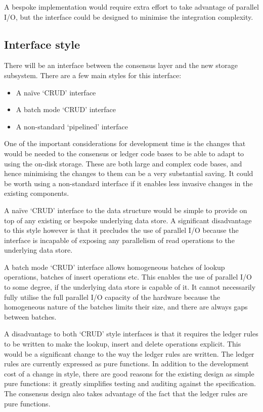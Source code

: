 \documentclass[11pt,a4paper]{article}
\begin{document}
A bespoke implementation would require extra effort to take advantage of
parallel I/O, but the interface could be designed to minimise the integration
complexity.

\subsection{Interface style}
\label{interface-style}

There will be an interface between the consensus layer and the new storage
subsystem. There are a few main styles for this interface:
\begin{itemize}
\setlength{\itemsep}{0pt}%
\setlength{\parskip}{1pt}%
\item A na\"ive `CRUD' interface
\item A batch mode `CRUD' interface
\item A non-standard `pipelined' interface
\end{itemize}

One of the important considerations for development time is the changes that
would be needed to the consensus or ledger code bases to be able to adapt to
using the on-disk storage. These are both large and complex code bases, and
hence minimising the changes to them can be a very substantial saving. It could
be worth using a non-standard interface if it enables less invasive changes in
the existing components.

A na\"ive `CRUD' interface to the data structure would be simple to provide on
top of any existing or bespoke underlying data store. A significant
disadvantage to this style however is that it precludes the use of parallel I/O
because the interface is incapable of exposing any parallelism of read
operations to the underlying data store.

A batch mode `CRUD' interface allows homogeneous batches of {\sc lookup}
operations, batches of {\sc insert} operations etc. This enables the use of
parallel I/O to some degree, if the underlying data store is capable of it. It
cannot necessarily fully utilise the full parallel I/O capacity of the hardware
because the homogeneous nature of the batches limits their size, and there are
always gaps between batches.

A disadvantage to both `CRUD' style interfaces is that it requires the ledger
rules to be written to make the {\sc lookup}, {\sc insert} and {\sc delete}
operations explicit. This would be a significant change to the way the ledger
rules are written. The ledger rules are currently expressed as pure functions.
In addition to the development cost of a change in style, there are good reasons
for the existing design as simple pure functions: it greatly simplifies testing
and auditing against the specification. The consensus design also takes
advantage of the fact that the ledger rules are pure functions.
\end{document}
